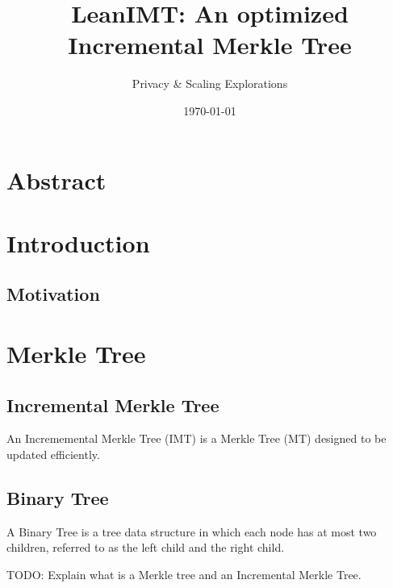 \documentclass{article}
\title{LeanIMT: An optimized Incremental Merkle Tree}
\author{Privacy \& Scaling Explorations}
\date{\today}
\begin{document}
\maketitle

\section{Abstract}

\newpage
\tableofcontents
\newpage

\section{Introduction}

\subsection{Motivation}

\section{Merkle Tree}

\subsection{Incremental Merkle Tree}

An Incrememental Merkle Tree (IMT) is a Merkle Tree (MT) designed to be updated efficiently.

\raggedright

\bigbreak

\subsection{Binary Tree}

A Binary Tree is a tree data structure in which each node has at most two children, referred to as the left child and the right child.

TODO: Explain what is a Merkle tree and an Incremental Merkle Tree.

\bigbreak

\end{document}
